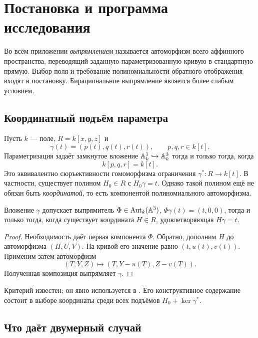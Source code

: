 \section{Постановка и программа исследования}\label{sec:program}

Во всём приложении \emph{выпрямлением} называется автоморфизм всего
аффинного пространства, переводящий заданную параметризованную кривую
в стандартную прямую. Выбор поля и требование полиномиальности обратного
отображения входят в постановку. Бирациональное выпрямление является
более слабым условием.

\subsection{Координатный подъём параметра}

Пусть $k$ --- поле, $R=k[x,y,z]$ и
\[
 \gamma(t)=(p(t),q(t),r(t)),\qquad p,q,r\in k[t].
\]
Параметризация задаёт замкнутое вложение ${\mathbb A}^1_k\hookrightarrow{\mathbb A}^3_k$
тогда и только тогда, когда
\begin{equation}\label{eq:closed-embedding}
 k[p,q,r]=k[t].
\end{equation}
Это эквивалентно сюръективности гомоморфизма ограничения
$\gamma^*:R\to k[t]$. В частности, существует полином $H_0\in R$
с $H_0\gamma=t$. Однако такой полином ещё не обязан быть
\emph{координатой}, то есть компонентой полиномиального автоморфизма.

\begin{lemma}\label{lem:coordinate-lift}
Вложение $\gamma$ допускает выпрямитель $\Phi\in\operatorname{Aut}_k({\mathbb A}^3)$,
$\Phi\gamma(t)=(t,0,0)$, тогда и только тогда, когда существует
координата $H\in R$, удовлетворяющая $H\gamma=t$.
\end{lemma}
\begin{proof}
Необходимость даёт первая компонента $\Phi$. Обратно, дополним $H$
до автоморфизма $(H,U,V)$. На кривой его значение равно
$(t,u(t),v(t))$. Применим затем автоморфизм
\[
 (T,Y,Z)\longmapsto(T,Y-u(T),Z-v(T)).
\]
Полученная композиция выпрямляет $\gamma$.
\end{proof}
Критерий известен; он явно используется в \cite[лемма~1]{Lewis2024}.
Его конструктивное содержание состоит в выборе координаты среди всех
подъёмов $H_0+\ker\gamma^*$.

\subsection{Что даёт двумерный случай}

